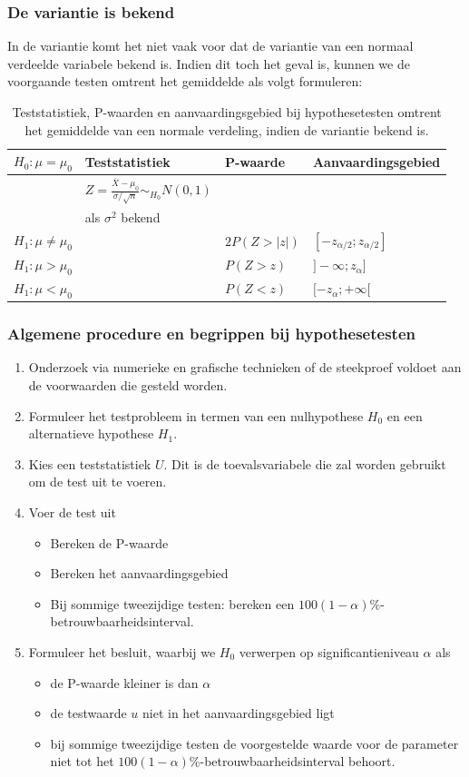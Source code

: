 \documentclass[titlepage]{article}
\numberwithin{equation}{section}
\begin{document}
\subsubsection{De variantie is bekend}
In de variantie komt het niet vaak voor dat de variantie van een normaal verdeelde variabele bekend is. Indien dit toch het geval is, kunnen we de voorgaande testen omtrent het gemiddelde als volgt formuleren:
\begin{table}[H]
\centering
\begin{tabular}{llll}
$H_0: \mu =\mu_0$ & Teststatistiek & P-waarde & Aanvaardingsgebied \\ \hline
  & $Z=\frac{\bar{X} - \mu_0}{\sigma/\sqrt{n}} \sim_{H_0} N(0,1)$ & & \\
  & als $\sigma^2$ bekend & & \\
$H_1: \mu \neq \mu_0$ & & $2P(Z>|z|)$ & {$[-z_{\alpha/2};z_{\alpha/2}]$}\\
$H_1 : \mu > \mu_0$ & & $P(Z>z)$ & {$]-\infty;z_\alpha]$} \\
$H_1: \mu < \mu_0$ & & $P(Z<z)$ & {$[-z_\alpha;+\infty[$}               
\end{tabular}
\caption{Teststatistiek, P-waarden en aanvaardingsgebied bij hypothesetesten omtrent het gemiddelde van een normale verdeling, indien de variantie bekend is.}
\end{table}
\subsubsection{Algemene procedure en begrippen bij hypothesetesten}
\begin{enumerate}
	\item Onderzoek via numerieke en grafische technieken of de steekproef voldoet aan de voorwaarden die gesteld worden.
	\item Formuleer het testprobleem in termen van een nulhypothese $H_0$ en een alternatieve hypothese $H_1$.
	\item Kies een teststatistiek $U$. Dit is de toevalsvariabele die zal worden gebruikt om de test uit te voeren.
	\item Voer de test uit \begin{itemize}
		\item Bereken de P-waarde
		\item Bereken het aanvaardingsgebied
		\item Bij sommige tweezijdige testen: bereken een $100(1-\alpha)$\%-betrouwbaarheidsinterval.
	\end{itemize}
	\item Formuleer het besluit, waarbij we $H_0$ verwerpen op significantieniveau $\alpha$ als \begin{itemize}
		\item de P-waarde kleiner is dan $\alpha$
		\item de testwaarde $u$ niet in het aanvaardingsgebied ligt
		\item bij sommige tweezijdige testen de voorgestelde waarde voor de parameter niet tot het $100(1-\alpha)$\%-betrouwbaarheidsinterval behoort.
	\end{itemize}
\end{enumerate}
\end{document}
